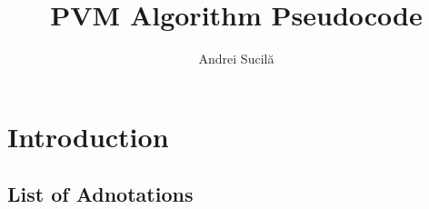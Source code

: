 \documentclass[a4paper,twoside,10pt]{report}
\begin{document}
\pagestyle{empty} %



\title{PVM Algorithm Pseudocode}
\author{Andrei Sucil\u a}
\maketitle



\tableofcontents %
\cleardoublepage %

\pagestyle{plain} %







\chapter{Introduction}\label{intro}


\section{List of Adnotations}\label{adnote_list}
\end{document}
